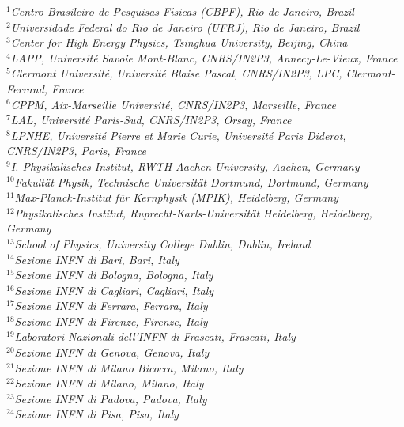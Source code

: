 \begin{flushleft}
{\footnotesize \it
$ ^{1}$Centro Brasileiro de Pesquisas F{\'\i}sicas (CBPF), Rio de Janeiro, Brazil\\
$ ^{2}$Universidade Federal do Rio de Janeiro (UFRJ), Rio de Janeiro, Brazil\\
$ ^{3}$Center for High Energy Physics, Tsinghua University, Beijing, China\\
$ ^{4}$LAPP, Universit{\'e} Savoie Mont-Blanc, CNRS/IN2P3, Annecy-Le-Vieux, France\\
$ ^{5}$Clermont Universit{\'e}, Universit{\'e} Blaise Pascal, CNRS/IN2P3, LPC, Clermont-Ferrand, France\\
$ ^{6}$CPPM, Aix-Marseille Universit{\'e}, CNRS/IN2P3, Marseille, France\\
$ ^{7}$LAL, Universit{\'e} Paris-Sud, CNRS/IN2P3, Orsay, France\\
$ ^{8}$LPNHE, Universit{\'e} Pierre et Marie Curie, Universit{\'e} Paris Diderot, CNRS/IN2P3, Paris, France\\
$ ^{9}$I. Physikalisches Institut, RWTH Aachen University, Aachen, Germany\\
$ ^{10}$Fakult{\"a}t Physik, Technische Universit{\"a}t Dortmund, Dortmund, Germany\\
$ ^{11}$Max-Planck-Institut f{\"u}r Kernphysik (MPIK), Heidelberg, Germany\\
$ ^{12}$Physikalisches Institut, Ruprecht-Karls-Universit{\"a}t Heidelberg, Heidelberg, Germany\\
$ ^{13}$School of Physics, University College Dublin, Dublin, Ireland\\
$ ^{14}$Sezione INFN di Bari, Bari, Italy\\
$ ^{15}$Sezione INFN di Bologna, Bologna, Italy\\
$ ^{16}$Sezione INFN di Cagliari, Cagliari, Italy\\
$ ^{17}$Sezione INFN di Ferrara, Ferrara, Italy\\
$ ^{18}$Sezione INFN di Firenze, Firenze, Italy\\
$ ^{19}$Laboratori Nazionali dell'INFN di Frascati, Frascati, Italy\\
$ ^{20}$Sezione INFN di Genova, Genova, Italy\\
$ ^{21}$Sezione INFN di Milano Bicocca, Milano, Italy\\
$ ^{22}$Sezione INFN di Milano, Milano, Italy\\
$ ^{23}$Sezione INFN di Padova, Padova, Italy\\
$ ^{24}$Sezione INFN di Pisa, Pisa, Italy\\
}
\end{flushleft}
